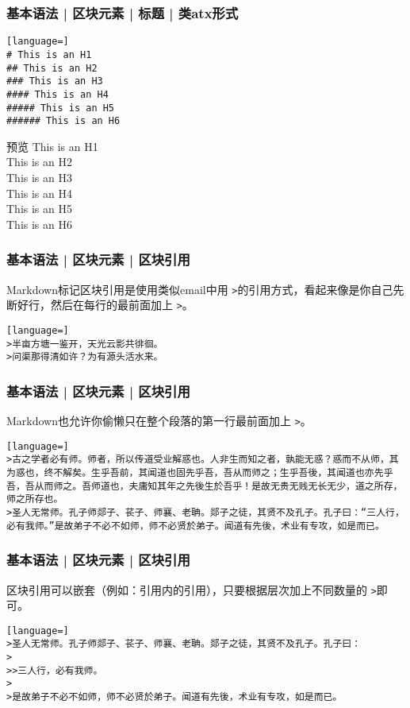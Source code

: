 \begin{frame}[fragile]
  \frametitle{基本语法 | 区块元素 | 标题 | \alert{类atx形式}}
\begin{lstlisting}[language=]
# This is an H1
## This is an H2
### This is an H3
#### This is an H4
##### This is an H5
###### This is an H6
\end{lstlisting}
\pause
\begin{block}{预览}
{\LARGE This is an H1}\\
{\Large This is an H2}\\
{\large This is an H3}\\
{\normalsize This is an H4}\\
{\small This is an H5}\\
{\footnotesize This is an H6}
\end{block}
\end{frame}

\begin{frame}[fragile]
  \frametitle{基本语法 | 区块元素 | \alert{区块引用}}
  Markdown标记区块引用是使用类似email中用 \verb|>|的引用方式，看起来像是你自己先断好行，然后在每行的最前面加上 \verb|>|。\\
\begin{lstlisting}[language=]
>半亩方塘一鉴开，天光云影共徘徊。
>问渠那得清如许？为有源头活水来。
\end{lstlisting}
\end{frame}

\begin{frame}[fragile]
  \frametitle{基本语法 | 区块元素 | 区块引用}
  Markdown也允许你偷懒只在整个段落的第一行最前面加上 \verb|>|。\\
\begin{lstlisting}[language=]
>古之学者必有师。师者，所以传道受业解惑也。人非生而知之者，孰能无惑？惑而不从师，其为惑也，终不解矣。生乎吾前，其闻道也固先乎吾，吾从而师之；生乎吾後，其闻道也亦先乎吾，吾从而师之。吾师道也，夫庸知其年之先後生於吾乎！是故无贵无贱无长无少，道之所存，师之所存也。
>圣人无常师。孔子师郯子、苌子、师襄、老聃。郯子之徒，其贤不及孔子。孔子曰：“三人行，必有我师。”是故弟子不必不如师，师不必贤於弟子。闻道有先後，术业有专攻，如是而已。
\end{lstlisting}
\end{frame}

\begin{frame}[fragile]
  \frametitle{基本语法 | 区块元素 | 区块引用}
  区块引用可以嵌套（例如：引用内的引用），只要根据层次加上不同数量的 \verb|>|即可。\\
\begin{lstlisting}[language=]
>圣人无常师。孔子师郯子、苌子、师襄、老聃。郯子之徒，其贤不及孔子。孔子曰：
>
>>三人行，必有我师。
>
>是故弟子不必不如师，师不必贤於弟子。闻道有先後，术业有专攻，如是而已。
\end{lstlisting}
\end{frame}

